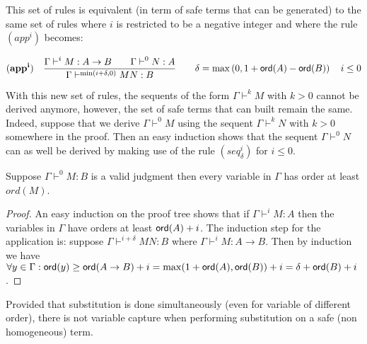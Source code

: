 \begin{rem}
\label{rem:rulesineg}

This set of rules is equivalent (in term of safe terms that can be
generated) to the same set of rules where $i$ is restricted to be a
negative integer and where the rule $(app^i)$ becomes:

$$ \mathbf{(app^i)} \quad  \frac{\displaystyle \Gamma \vdash^i M : A\rightarrow B
                                        \qquad \Gamma \vdash^{0} N : A}{\Gamma  \vdash^{\min(i+\delta,0)} M N : B}
                                    \qquad
                                   \delta = \max\left(0, 1 + {\sf ord}(A) - {\sf ord}(B)\right) \quad i \leq 0 $$

With this new set of rules, the sequents of the form $\Gamma
\vdash^{k} M$ with $k>0$ cannot be derived anymore, however, the set
of safe terms that can built remain the same. Indeed, suppose that
we derive $\Gamma \vdash^0 M$ using the sequent $\Gamma \vdash^k N$
with $k>0$ somewhere in the proof. Then an easy induction shows that
the sequent $\Gamma \vdash^0 N$ can as well be derived by making use
of the rule $(seq^i_\delta)$ for $i\leq 0$.
\end{rem}

\begin{lem}
\label{lem:nonhomosafe_basic_prop} Suppose $\Gamma \vdash^0 M : B$
is a valid judgment then every variable in $\Gamma$ has order at
least $ord(M)$.
\end{lem}
\begin{proof}
An easy induction on the proof tree shows that if $\Gamma \vdash^{i}
M : A$ then the variables in $\Gamma$ have orders at least
${\sf ord}(A)+i$. The induction step for the application is: suppose
$\Gamma  \vdash^{i+\delta} M N : B$ where $\Gamma \vdash^i M :
A\rightarrow B$. Then by induction we have $\forall y \in \Gamma :
{\sf ord}(y) \geq {\sf ord}(A\rightarrow B) + i = \max(1+{\sf ord}(A), {\sf ord}(B))+i =
\delta + {\sf ord}(B) + i$.
\end{proof}

\begin{lem}
Provided that substitution is done simultaneously (even for variable
of different order), there is not variable capture when performing
substitution on a safe (non homogeneous) term.
\end{lem}

